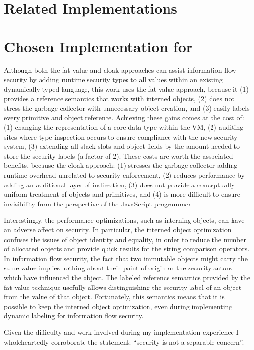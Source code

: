 \section{Related Implementations}\label{sec:related-work}


\section{Chosen Implementation for \FlowCore}\label{sec:conclusion}
\label{sec:chosen-implementation}

Although both the fat value and cloak approaches can assist information flow security by adding runtime security types to all values within an existing dynamically typed language, this work uses the fat value approach, because it
(1) provides a reference semantics that works with interned objects,
(2) does not stress the garbage collector with unnecessary object creation,
and (3) easily labels every primitive and object reference.
Achieving these gains comes at the cost of:
(1) changing the representation of a core data type within the VM,
(2) auditing sites where type inspection occurs to ensure compliance with the new security system,
(3) extending all stack slots and object fields by the amount needed to store the security labels (a factor of 2).
These costs are worth the associated benefits, because the cloak approach:
(1) stresses the garbage collector adding runtime overhead unrelated to security enforcement,
(2) reduces performance by adding an additional layer of indirection,
(3) does not provide a conceptually uniform treatment of objects and primitives,
and (4) is more difficult to ensure invisibility from the perspective of the JavaScript programmer.

Interestingly, the performance optimizations, such as interning  objects, can have an adverse affect on security.
In particular, the interned object optimization confuses the issues of object identity and equality, in order to reduce the number of allocated objects and provide quick results for the string comparison operators.
In information flow security, the fact that two immutable objects might carry the same value implies nothing about their point of origin or the security actors which have influenced the object.
The labeled reference semantics provided by the fat value technique usefully allows distinguishing the security label of an object from the value of that object.
Fortunately, this semantics means that it is possible to keep the interned object optimization, even during implementing dynamic labeling for information flow security.

Given the difficulty and work involved during my implementation experience I wholeheartedly corroborate the statement: ``security is not a separable concern''\cite{miller.etal+04}.


